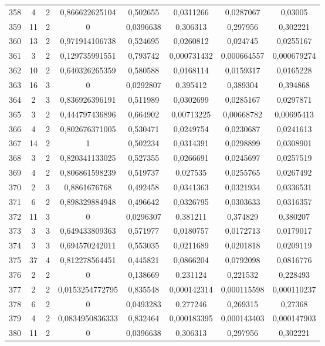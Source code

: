 \begin{longtable}{|c|c|c|c|c|c|c|c|}
358 & 4 & 2 & 0,866622625104 & 0,502655 & 0,0311266 & 0,0287067 & 0,03005  \\
359 & 11 & 2 & 0 & 0,0396638 & 0,306313 & 0,297956 & 0,302221  \\
360 & 13 & 2 & 0,971914106738 & 0,524695 & 0,0260812 & 0,024745 & 0,0255167  \\
361 & 3 & 2 & 0,129735991551 & 0,793742 & 0,000731432 & 0,000664557 & 0,000679274  \\
362 & 10 & 2 & 0,640326265359 & 0,580588 & 0,0168114 & 0,0159317 & 0,0165228  \\
363 & 16 & 3 & 0 & 0,0292807 & 0,395412 & 0,389304 & 0,394868  \\
364 & 2 & 3 & 0,836926396191 & 0,511989 & 0,0302699 & 0,0285167 & 0,0297871  \\
365 & 3 & 2 & 0,444797436896 & 0,664902 & 0,00713225 & 0,00668782 & 0,00695413  \\
366 & 4 & 2 & 0,802676371005 & 0,530471 & 0,0249754 & 0,0230687 & 0,0241613  \\
367 & 14 & 2 & 1 & 0,502234 & 0,0314391 & 0,0298899 & 0,0308901  \\
368 & 3 & 2 & 0,820341133025 & 0,527355 & 0,0266691 & 0,0245697 & 0,0257519  \\
369 & 4 & 2 & 0,806861598239 & 0,519737 & 0,027535 & 0,0255765 & 0,0267492  \\
370 & 2 & 3 & 0,8861676768 & 0,492458 & 0,0341363 & 0,0321934 & 0,0336531  \\
371 & 6 & 2 & 0,898329884948 & 0,496642 & 0,0326795 & 0,0303633 & 0,0316357  \\
372 & 11 & 3 & 0 & 0,0296307 & 0,381211 & 0,374829 & 0,380207  \\
373 & 3 & 3 & 0,649433809363 & 0,571977 & 0,0180757 & 0,0172713 & 0,0179017  \\
374 & 3 & 3 & 0,694570242011 & 0,553035 & 0,0211689 & 0,0201818 & 0,0209119  \\
375 & 37 & 4 & 0,812278564451 & 0,445821 & 0,0866204 & 0,0792098 & 0,0816776  \\
376 & 2 & 2 & 0 & 0,138669 & 0,231124 & 0,221532 & 0,228493  \\
377 & 2 & 2 & 0,0153254772795 & 0,835548 & 0,000142314 & 0,000115598 & 0,000110237  \\
378 & 6 & 2 & 0 & 0,0493283 & 0,277246 & 0,269315 & 0,27368  \\
379 & 4 & 2 & 0,0834950836333 & 0,832464 & 0,000183395 & 0,000143403 & 0,000147903  \\
380 & 11 & 2 & 0 & 0,0396638 & 0,306313 & 0,297956 & 0,302221  \\

\end{longtable}
